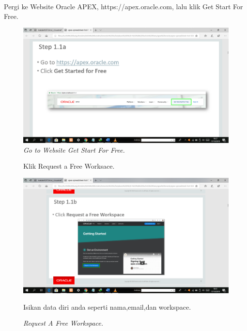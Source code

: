 \begin{enumerate}
\item[1]Pergi ke Website Oracle APEX, https://apex.oracle.com, lalu klik Get Start For Free.

\begin{figure}[!htbp]
    \begin{center}
    \includegraphics[scale=0.2]{figures/pict(1).png}
    \caption{\textit{Go to Website Get Start For Free.}}
    \end{center}   
    \end{figure}
    
\begin{figure}[!htbp]
\item[2]Klik Request a Free Worksace.

    \begin{center}
    \includegraphics[scale=0.2]{figures/pict(2).png}
    \caption{\textit{Request A Free Workspace.}}
    \end{center}

\item[3]Isikan data diri anda seperti nama,email,dan workspace.


\end{figure}
\end{enumerate}
